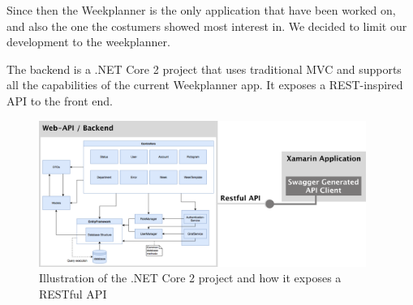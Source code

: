 Since then the Weekplanner is the only application that have been worked on, and also the one the costumers showed most interest in. We decided to limit our development to the weekplanner. 


The backend is a .NET Core 2 project that uses traditional MVC and supports all the capabilities of the current Weekplanner app. It exposes a REST-inspired API to the front end.
\begin{figure}[H]
        \begin{center}
            \includegraphics[width=0.95\textwidth]{figures/RestAPIFigure.pdf}
        \end{center}
        \caption{Illustration of the .NET Core 2 project and how it exposes a RESTful API}
        \label{fig:RestAPIFigure}
\end{figure}

